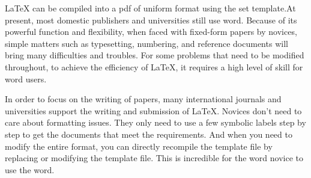 \begin{abstracten}

LaTeX can be compiled into a pdf of uniform format using the set template.At present, most domestic publishers and universities still use word. Because of its powerful function and flexibility, when faced with fixed-form papers by novices, simple matters such as typesetting, numbering, and reference documents will bring many difficulties and troubles. For some problems that need to be modified throughout, to achieve the efficiency of LaTeX, it requires a high level of skill for word users.

In order to focus on the writing of papers, many international journals and universities support the writing and submission of LaTeX. Novices don't need to care about formatting issues. They only need to use a few symbolic labels step by step to get the documents that meet the requirements. And when you need to modify the entire format, you can directly recompile the template file by replacing or modifying the template file. This is incredible for the word novice to use the word.


\end{abstracten}